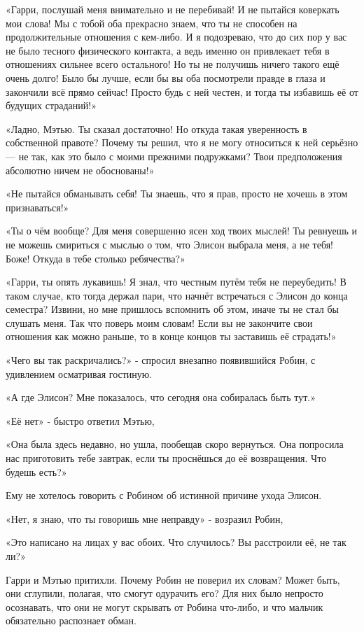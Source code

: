 \documentclass[a5paper, 9pt,
final, openany, twoside=true]{memoir}
\begin{document}
«Гарри, послушай меня внимательно и не перебивай! И не пытайся коверкать мои слова! Мы с тобой оба прекрасно знаем, что ты не способен на продолжительные отношения с кем-либо. И я подозреваю, что до сих пор у вас не было тесного физического контакта, а ведь именно он привлекает тебя в отношениях сильнее всего остального! Но ты не получишь ничего такого ещё очень долго! Было бы лучше, если бы вы оба посмотрели правде в глаза и закончили всё прямо сейчас! Просто будь с ней честен, и тогда ты избавишь её от будущих страданий!»

«Ладно, Мэтью. Ты сказал достаточно! Но откуда такая уверенность в собственной правоте? Почему ты решил, что я не могу относиться к ней серьёзно — не так, как это было с моими прежними подружками? Твои предположения абсолютно ничем не обоснованы!»

«Не пытайся обманывать себя! Ты знаешь, что я прав, просто не хочешь в этом признаваться!»

«Ты о чём вообще? Для меня совершенно ясен ход твоих мыслей! Ты ревнуешь и не можешь смириться с мыслью о том, что Элисон выбрала меня, а не тебя! Боже! Откуда в тебе столько ребячества?»

«Гарри, ты опять лукавишь! Я знал, что честным путём тебя не переубедить! В таком случае, кто тогда держал пари, что начнёт встречаться с Элисон до конца семестра? Извини, но мне пришлось вспомнить об этом, иначе ты не стал бы слушать меня. Так что поверь моим словам! Если вы не закончите свои отношения как можно раньше, то в конце концов ты заставишь её страдать!»

«Чего вы так раскричались?» - спросил внезапно появившийся Робин, с удивлением осматривая гостиную.

«А где Элисон? Мне показалось, что сегодня она собиралась быть тут.»

«Её нет» - быстро ответил Мэтью,

«Она была здесь недавно, но ушла, пообещав скоро вернуться. Она попросила нас приготовить тебе завтрак, если ты проснёшься до её возвращения. Что будешь есть?»

Ему не хотелось говорить с Робином об истинной причине ухода Элисон.

«Нет, я знаю, что ты говоришь мне неправду» - возразил Робин,

«Это написано на лицах у вас обоих. Что случилось? Вы расстроили её, не так ли?»

Гарри и Мэтью притихли. Почему Робин не поверил их словам? Может быть, они сглупили, полагая, что смогут одурачить его? Для них было непросто осознавать, что они не могут скрывать от Робина что-либо, и что мальчик обязательно распознает обман.
\end{document}
